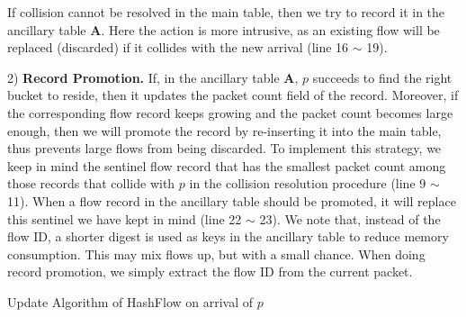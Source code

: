 If collision cannot be resolved in the main table, 
then we try to record it in the ancillary table ${\mathbf A}$.
Here the action is more intrusive, 
as an existing flow will be replaced (discarded) if it collides with the new arrival (line 16 $\sim$ 19).

2) \textbf{Record Promotion.} If, in the ancillary table ${\mathbf A}$, $p$ succeeds to find the right bucket to reside, 
then it updates the packet count field of the record. 
Moreover, if the corresponding flow record keeps growing and the packet count becomes large enough, 
then we will promote the record by re-inserting it into the main table,
thus prevents large flows from being discarded. 
To implement this strategy, we keep in mind the sentinel flow record that has the smallest packet count 
among those records that collide with $p$ in the collision resolution procedure (line 9 $\sim$ 11). 
When a flow record in the ancillary table should be promoted, it will replace this sentinel  
we have kept in mind (line 22 $\sim$ 23).
We note that, instead of the flow ID, a shorter digest is used as keys in the ancillary table to 
reduce memory consumption. This may mix flows up, but with a small chance. When doing record promotion, we simply extract the flow ID from the current packet.


 
\begin{algorithm}[ht!]
    \caption{Update Algorithm of HashFlow on arrival of $p$}
    \label{alg: process_packet}
    \algrenewcommand{}
    \begin{algorithmic}[1]
        \Return
        \Return
        \EndIf
        \EndFor
        \Else
        \EndIf
    \end{algorithmic}
\end{algorithm}


